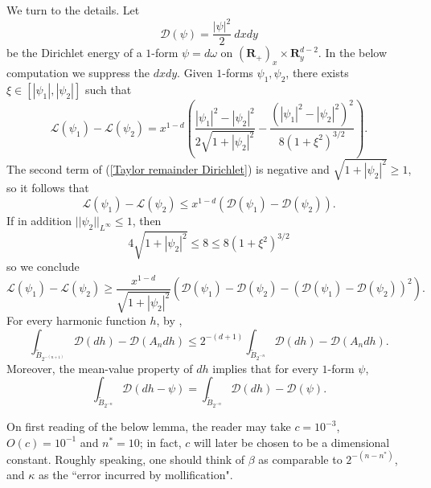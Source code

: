 \documentclass[reqno,12pt,letterpaper]{amsart}
\newcommand{\RR}{\mathbf{R}}
\newcommand{\Lagrange}{\mathscr L}
\newcommand{\DirL}{\mathscr D}
\theoremstyle{definition}
\numberwithin{equation}{section}
\begin{document}
We turn to the details.
Let
$$\DirL(\psi) = \frac{|\psi|^2}{2} ~dxdy$$
be the Dirichlet energy of a $1$-form $\psi = d\omega$ on $(\RR_+)_x \times \RR^{d - 2}_y$.
In the below computation we suppress the $dxdy$.
Given $1$-forms $\psi_1, \psi_2$, there exists $\xi \in [|\psi_1|, |\psi_2|]$ such that
\begin{equation}\label{Taylor remainder Dirichlet}
\Lagrange(\psi_1) - \Lagrange(\psi_2) = x^{1 - d}\left(\frac{|\psi_1|^2 - |\psi_2|^2}{2\sqrt{1 + |\psi_2|^2}} - \frac{(|\psi_1|^2 - |\psi_2|^2)^2}{8(1 + \xi^2)^{3/2}}\right).
\end{equation}
The second term of (\ref{Taylor remainder Dirichlet}) is negative and $\sqrt{1 + |\psi_2|^2} \geq 1$, so it follows that
\begin{equation}\label{Taylor lower bound}
\Lagrange(\psi_1) - \Lagrange(\psi_2) \leq x^{1 - d} (\DirL(\psi_1) - \DirL(\psi_2)).
\end{equation}
If in addition $||\psi_2||_{L^\infty} \leq 1$, then
$$4\sqrt{1 + |\psi_2|^2} \leq 8 \leq 8(1 + \xi^2)^{3/2}$$
so we conclude
\begin{equation}\label{Taylor upper bound}
\Lagrange(\psi_1) - \Lagrange(\psi_2) \geq \frac{x^{1 - d}}{\sqrt{1 + |\psi_2|^2}} (\DirL(\psi_1) - \DirL(\psi_2) - (\DirL(\psi_1) - \DirL(\psi_2))^2).
\end{equation}
For every harmonic function $h$, by \cite[Lemma 4.1]{Miranda66},
\begin{equation}\label{Miranda41}
\int_{\tilde B_{2^{-(n+1)}}} \DirL(dh) - \DirL(A_n dh) \leq 2^{-(d + 1)} \int_{\tilde B_{2^{-n}}} \DirL(dh) - \DirL(A_n dh).
\end{equation}
Moreover, the mean-value property of $dh$ implies that for every $1$-form $\psi$,
\begin{equation}\label{MVP derivative}
\int_{\tilde B_{2^{-n}}} \DirL(dh - \psi) = \int_{\tilde B_{2^{-n}}} \DirL(dh) - \DirL(\psi).
\end{equation}

On first reading of the below lemma, the reader may take $c = 10^{-3}$, $O(c) = 10^{-1}$ and $n^* = 10$; in fact, $c$ will later be chosen to be a dimensional constant.
Roughly speaking, one should think of $\beta$ as comparable to $2^{-(n - n^*)}$, and $\kappa$ as the ``error incurred by mollification".
\end{document}
